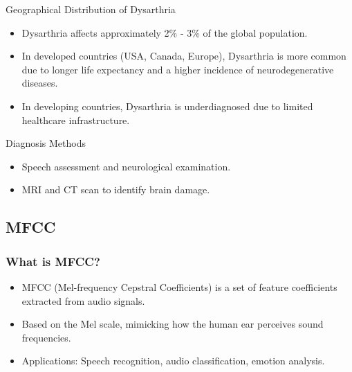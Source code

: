 \begin{frame}{Geographical Distribution of Dysarthria}
    \begin{itemize}
        \item Dysarthria affects approximately 2\% - 3\% of the global population.
        \item In developed countries (USA, Canada, Europe), Dysarthria is more common due to longer life expectancy and a higher incidence of neurodegenerative diseases.
        \item In developing countries, Dysarthria is underdiagnosed due to limited healthcare infrastructure.
    \end{itemize}
\end{frame}

\begin{frame}{Diagnosis Methods}
        \begin{itemize}
            \item Speech assessment and neurological examination.
            \item MRI and CT scan to identify brain damage.
        \end{itemize}
\end{frame}
\subsection{MFCC}


\begin{frame}
    \frametitle{What is MFCC?}
    \begin{itemize}
        \item MFCC (Mel-frequency Cepstral Coefficients) is a set of feature coefficients extracted from audio signals.
        \item Based on the Mel scale, mimicking how the human ear perceives sound frequencies.
        \item Applications: Speech recognition, audio classification, emotion analysis.
    \end{itemize}
\end{frame}

